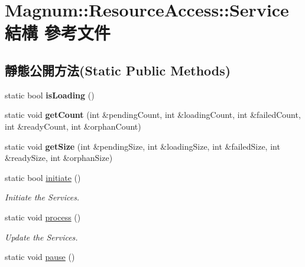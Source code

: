 \hypertarget{struct_magnum_1_1_resource_access_1_1_service}{}\section{Magnum\+:\+:Resource\+Access\+:\+:Service 結構 參考文件}
\label{struct_magnum_1_1_resource_access_1_1_service}
\subsection*{靜態公開方法(Static Public Methods)}
\begin{DoxyCompactItemize}
\item 
static bool {\bfseries is\+Loading} ()\hypertarget{struct_magnum_1_1_resource_access_1_1_service_aa893341be664102caa787bc7d4ca9abe}{}\label{struct_magnum_1_1_resource_access_1_1_service_aa893341be664102caa787bc7d4ca9abe}

\item 
static void {\bfseries get\+Count} (int \&pending\+Count, int \&loading\+Count, int \&failed\+Count, int \&ready\+Count, int \&orphan\+Count)\hypertarget{struct_magnum_1_1_resource_access_1_1_service_ab1a8c5048ce37c67dd88bdf0fc5001b2}{}\label{struct_magnum_1_1_resource_access_1_1_service_ab1a8c5048ce37c67dd88bdf0fc5001b2}

\item 
static void {\bfseries get\+Size} (int \&pending\+Size, int \&loading\+Size, int \&failed\+Size, int \&ready\+Size, int \&orphan\+Size)\hypertarget{struct_magnum_1_1_resource_access_1_1_service_a060b0eeff2fa293bdbd48b673e6e5edb}{}\label{struct_magnum_1_1_resource_access_1_1_service_a060b0eeff2fa293bdbd48b673e6e5edb}

\item 
static bool \hyperlink{struct_magnum_1_1_resource_access_1_1_service_a9362ec91113c48e4d533109aaf3d62cc}{initiate} ()
\begin{DoxyCompactList}\small\item\em Initiate the Services. \end{DoxyCompactList}\item 
static void \hyperlink{struct_magnum_1_1_resource_access_1_1_service_a19f4264ebeadf64afe20dd059d719cd3}{process} ()\hypertarget{struct_magnum_1_1_resource_access_1_1_service_a19f4264ebeadf64afe20dd059d719cd3}{}\label{struct_magnum_1_1_resource_access_1_1_service_a19f4264ebeadf64afe20dd059d719cd3}

\begin{DoxyCompactList}\small\item\em Update the Services. \end{DoxyCompactList}\item 
static void \hyperlink{struct_magnum_1_1_resource_access_1_1_service_a039af370ffb5a269043ea3fe913e5ceb}{pause} ()\hypertarget{struct_magnum_1_1_resource_access_1_1_service_a039af370ffb5a269043ea3fe913e5ceb}{}\label{struct_magnum_1_1_resource_access_1_1_service_a039af370ffb5a269043ea3fe913e5ceb}


\end{DoxyCompactItemize}
